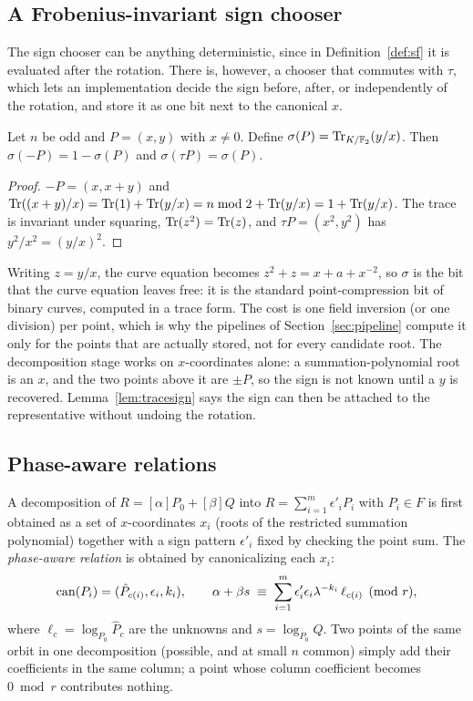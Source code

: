 \subsection{A Frobenius-invariant sign chooser}

The sign chooser can be anything deterministic, since in
Definition~\ref{def:sf} it is evaluated after the rotation. There is,
however, a chooser that commutes with $\tau$, which lets an
implementation decide the sign before, after, or independently of the
rotation, and store it as one bit next to the canonical $x$.

\begin{lemma}
\label{lem:tracesign}
Let $n$ be odd and $P=(x,y)$ with $x\ne0$. Define
$\sigma(P)=\operatorname{Tr}_{K/\mathbb{F}_2}(y/x)$. Then
$\sigma(-P)=1-\sigma(P)$ and $\sigma(\tau P)=\sigma(P)$.
\end{lemma}
\begin{proof}
$-P=(x,x+y)$ and $\operatorname{Tr}((x+y)/x)=\operatorname{Tr}(1)+\operatorname{Tr}(y/x)=n\bmod 2+\operatorname{Tr}(y/x)
=1+\operatorname{Tr}(y/x)$. The trace is invariant under squaring,
$\operatorname{Tr}(z^2)=\operatorname{Tr}(z)$, and $\tau P=(x^2,y^2)$ has $y^2/x^2=(y/x)^2$.
\end{proof}

Writing $z=y/x$, the curve equation becomes $z^2+z=x+a+x^{-2}$, so
$\sigma$ is the bit that the curve equation leaves free: it is the
standard point-compression bit of binary curves, computed in a trace
form. The cost is one field inversion (or one division) per point,
which is why the pipelines of Section~\ref{sec:pipeline} compute it
only for the points that are actually stored, not for every candidate
root. The decomposition stage works on $x$-coordinates alone: a
summation-polynomial root is an $x$, and the two points above it are
$\pm P$, so the sign is not known until a $y$ is recovered. Lemma~\ref{lem:tracesign} says the sign can then be attached to the
representative without undoing the rotation.

\subsection{Phase-aware relations}
\label{sec:phase-aware}

A decomposition of $R=[\alpha]P_0+[\beta]Q$ into
$R=\sum_{i=1}^m\epsilon'_iP_i$ with $P_i\in F$ is first obtained as a
set of $x$-coordinates $x_i$ (roots of the restricted summation
polynomial) together with a sign pattern $\epsilon'_i$ fixed by
checking the point sum. The \emph{phase-aware relation} is obtained by
canonicalizing each $x_i$:
\[
  \operatorname{can}(P_i)=(\hat P_{c(i)},\epsilon_i,k_i),\qquad
  \alpha+\beta s\;\equiv\;\sum_{i=1}^m \epsilon'_i\epsilon_i\lambda^{-k_i}
  \,\ell_{c(i)}\pmod r,
\]
where $\ell_c=\log_{P_0}\hat P_c$ are the unknowns and $s=\log_{P_0}Q$.
Two points of the same orbit in one decomposition (possible, and at
small $n$ common) simply add their coefficients in the same column; a
point whose column coefficient becomes $0\bmod r$ contributes nothing.

